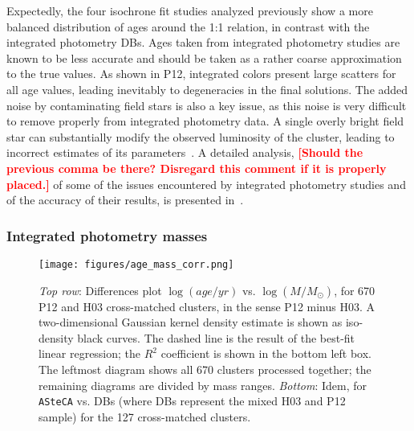 \documentclass[draft]{aa}
\newcommand{\LEt}[1]{\textcolor{red}{\textbf{[#1]}}}
\renewcommand{\includegraphics}[2][]{}
\begin{document}
Expectedly, the four isochrone fit studies analyzed previously show a more
balanced distribution of ages around the 1:1 relation, in contrast with the
integrated photometry DBs. Ages taken from integrated photometry studies are
known to be less accurate and should be taken as a rather coarse approximation
to the true values.
%
As shown in P12, integrated colors present large scatters for all age values,
leading inevitably to degeneracies in the final solutions.
The added noise by contaminating field stars is also a key issue, as this noise is
very difficult to remove properly from integrated photometry data. A
single overly bright field star can substantially modify the observed
luminosity of the cluster, leading to incorrect estimates of its
parameters~\citep{Baumgardt_2013,Piatti_2014_B88}.
A detailed analysis, \LEt{Should the previous comma be there? Disregard this
comment if it is properly placed.} of some of the
issues encountered by integrated photometry
studies and of the accuracy of their results, is presented in~\cite{Anders_2013}.



\subsubsection{Integrated photometry masses}
\label{sssec:integ_photom_masses}
%
%
%
%

\begin{figure*}
\centering
\texttt{[image: figures/age\_mass\_corr.png]}
\caption{\emph{Top row}: Differences plot $\log(age/yr)$ vs.
$\log(M/M_{\odot})$, for 670 P12 and H03 cross-matched clusters, in the sense
P12 minus H03.
A two-dimensional Gaussian kernel density estimate is shown as iso-density black
curves. The dashed line is the result of the best-fit linear regression;
the $R^2$ coefficient is shown in the bottom left box.
The leftmost diagram shows all 670 clusters processed together; the remaining
diagrams are divided by mass ranges.
\emph{Bottom}: Idem, for \texttt{ASteCA} vs. DBs (where DBs represent the
mixed H03 and P12 sample) for the 127 cross-matched clusters.}
\label{fig:age_mass_corr}
\end{figure*}
\end{document}
